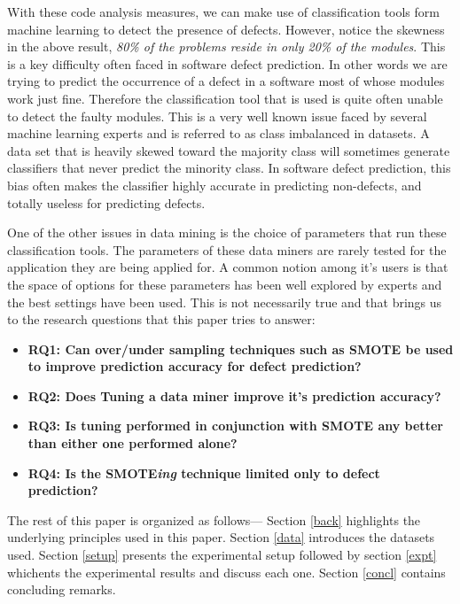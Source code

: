 \documentclass[12pt]{IEEEtran}
\begin{document}
With these code analysis measures, we can make use of classification tools form machine learning to detect the presence of defects. However, notice the skewness in the above result, \textit{ 80\% of the problems reside in only 20\% of the modules}. This is a key difficulty often faced in software defect prediction. In other words we are trying to predict the occurrence of a defect in a software most of whose modules work just fine. Therefore the classification tool that is used is quite often unable to detect the faulty modules. This is a very well known issue faced by several machine learning experts and is referred to as class imbalanced in datasets. A data set that is heavily skewed toward the majority class will sometimes generate classifiers that never predict the minority class. In software defect prediction, this bias often makes the classifier highly accurate in predicting non-defects, and totally useless for predicting defects.

One of the other issues in data mining is the choice of parameters that run these classification tools. The parameters of these data miners are rarely tested for the application they are being applied for. A common notion among it's users is that the space of options for these parameters has been well explored by experts and the best settings have been used. This is not necessarily true and that brings us to the research questions that this paper tries to answer:
\begin{itemize}
\item[] {\bfseries RQ1:  Can over/under sampling techniques such as SMOTE be used to improve prediction accuracy for defect prediction?}
\item[] {\bfseries RQ2: Does Tuning a data miner improve it's prediction accuracy?}
\item[] {\bfseries RQ3: Is tuning performed in conjunction with SMOTE any better than either one performed alone?}
\item[] {\bfseries RQ4: Is the SMOTE\textit{ing} technique limited only to defect prediction?}
\end{itemize}



The rest of this paper is organized as follows--- Section \ref{back} highlights the underlying principles used in this paper. Section \ref{data} introduces the datasets used. Section \ref{setup} presents the experimental setup followed by section \ref{expt} whichents the experimental results and discuss each one. Section \ref{concl} contains concluding remarks.\\[-1cm]
\end{document}
